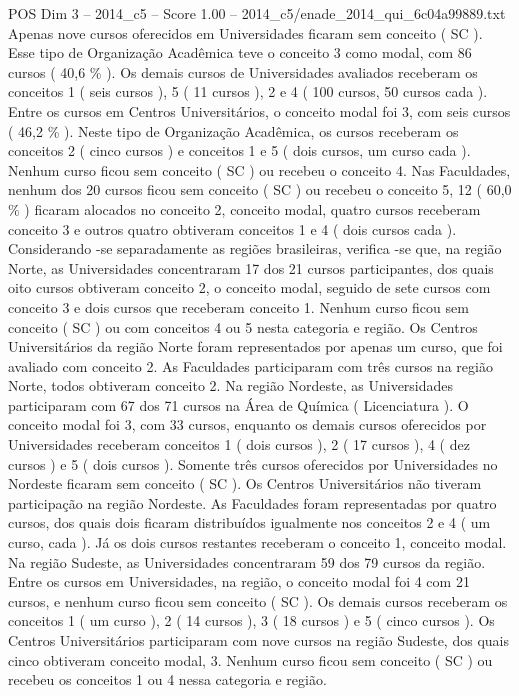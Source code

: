 \begin{textsample}{POS Dim 3 – 2014\_c5 – Score 1.00 – 2014\_c5/enade\_2014\_qui\_6c04a99889.txt}
Apenas nove cursos oferecidos em Universidades ficaram sem conceito ( SC ).
Esse tipo de Organização Acadêmica teve o conceito 3 como modal, com 86 cursos ( 40,6 \% ).
Os demais cursos de Universidades avaliados receberam os conceitos 1 ( seis cursos ), 5 ( 11 cursos ), 2 e 4 ( 100 cursos, 50 cursos cada ).
Entre os cursos em Centros Universitários, o conceito modal foi 3, com seis cursos ( 46,2 \% ).
Neste tipo de Organização Acadêmica, os cursos receberam os conceitos 2 ( cinco cursos ) e conceitos 1 e 5 ( dois cursos, um curso cada ).
Nenhum curso ficou sem conceito ( SC ) ou recebeu o conceito 4.
Nas Faculdades, nenhum dos 20 cursos ficou sem conceito ( SC ) ou recebeu o conceito 5, 12 ( 60,0 \% ) ficaram alocados no conceito 2, conceito modal, quatro cursos receberam conceito 3 e outros quatro obtiveram conceitos 1 e 4 ( dois cursos cada ).
Considerando -se separadamente as regiões brasileiras, verifica -se que, na região Norte, as Universidades concentraram 17 dos 21 cursos participantes, dos quais oito cursos obtiveram conceito 2, o conceito modal, seguido de sete cursos com conceito 3 e dois cursos que receberam conceito 1.
Nenhum curso ficou sem conceito ( SC ) ou com conceitos 4 ou 5 nesta categoria e região.
Os Centros Universitários da região Norte foram representados por apenas um curso, que foi avaliado com conceito 2.
As Faculdades participaram com três cursos na região Norte, todos obtiveram conceito 2.
Na região Nordeste, as Universidades participaram com 67 dos 71 cursos na Área de Química ( Licenciatura ).
O conceito modal foi 3, com 33 cursos, enquanto os demais cursos oferecidos por Universidades receberam conceitos 1 ( dois cursos ), 2 ( 17 cursos ), 4 ( dez cursos ) e 5 ( dois cursos ).
Somente três cursos oferecidos por Universidades no Nordeste ficaram sem conceito ( SC ).
Os Centros Universitários não tiveram participação na região Nordeste.
As Faculdades foram representadas por quatro cursos, dos quais dois ficaram distribuídos igualmente nos conceitos 2 e 4 ( um curso, cada ).
Já os dois cursos restantes receberam o conceito 1, conceito modal.
Na região Sudeste, as Universidades concentraram 59 dos 79 cursos da região.
Entre os cursos em Universidades, na região, o conceito modal foi 4 com 21 cursos, e nenhum curso ficou sem conceito ( SC ).
Os demais cursos receberam os conceitos 1 ( um curso ), 2 ( 14 cursos ), 3 ( 18 cursos ) e 5 ( cinco cursos ).
Os Centros Universitários participaram com nove cursos na região Sudeste, dos quais cinco obtiveram conceito modal, 3.
Nenhum curso ficou sem conceito ( SC ) ou recebeu os conceitos 1 ou 4 nessa categoria e região.

\end{textsample}
